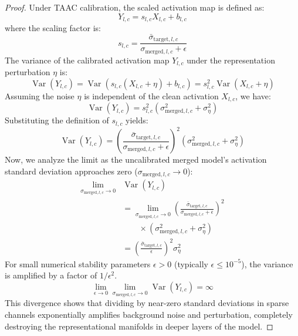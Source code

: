 \documentclass{article}
\theoremstyle{plain}
\theoremstyle{definition}
\theoremstyle{remark}
\begin{document}
\begin{proof}
Under TAAC calibration, the scaled activation map is defined as:
\begin{equation}
    Y_{l, c} = s_{l, c} X_{l, c} + b_{l, c}
\end{equation}
where the scaling factor is:
\begin{equation}
    s_{l, c} = \frac{\bar{\sigma}_{\text{target}, l, c}}{\sigma_{\text{merged}, l, c} + \epsilon}
\end{equation}
The variance of the calibrated activation map $Y_{l, c}$ under the representation perturbation $\eta$ is:
\begin{equation}
    \operatorname{Var}(Y_{l, c}) = \operatorname{Var}(s_{l, c} (X_{l, c} + \eta) + b_{l, c}) = s_{l, c}^2 \operatorname{Var}(X_{l, c} + \eta)
\end{equation}
Assuming the noise $\eta$ is independent of the clean activation $X_{l, c}$, we have:
\begin{equation}
    \operatorname{Var}(Y_{l, c}) = s_{l, c}^2 \left( \sigma_{\text{merged}, l, c}^2 + \sigma_{\eta}^2 \right)
\end{equation}
Substituting the definition of $s_{l, c}$ yields:
\begin{equation}
    \operatorname{Var}(Y_{l, c}) = \left( \frac{\bar{\sigma}_{\text{target}, l, c}}{\sigma_{\text{merged}, l, c} + \epsilon} \right)^2 \left( \sigma_{\text{merged}, l, c}^2 + \sigma_{\eta}^2 \right)
\end{equation}
Now, we analyze the limit as the uncalibrated merged model's activation standard deviation approaches zero ($\sigma_{\text{merged}, l, c} \to 0$):
\begin{align}
    \lim_{\sigma_{\text{merged}, l, c} \to 0} &\operatorname{Var}(Y_{l, c}) \nonumber \\
    &= \lim_{\sigma_{\text{merged}, l, c} \to 0} \left( \frac{\bar{\sigma}_{\text{target}, l, c}}{\sigma_{\text{merged}, l, c} + \epsilon} \right)^2 \nonumber \\
    &\quad\quad \times \left( \sigma_{\text{merged}, l, c}^2 + \sigma_{\eta}^2 \right) \nonumber \\
    &= \left( \frac{\bar{\sigma}_{\text{target}, l, c}}{\epsilon} \right)^2 \sigma_{\eta}^2
\end{align}
For small numerical stability parameters $\epsilon > 0$ (typically $\epsilon \le 10^{-5}$), the variance is amplified by a factor of $1/\epsilon^2$.
\begin{equation}
    \lim_{\epsilon \to 0} \lim_{\sigma_{\text{merged}, l, c} \to 0} \operatorname{Var}(Y_{l, c}) = \infty
\end{equation}
This divergence shows that dividing by near-zero standard deviations in sparse channels exponentially amplifies background noise and perturbation, completely destroying the representational manifolds in deeper layers of the model.
\end{proof}
\end{document}
